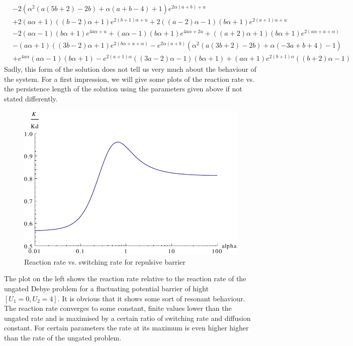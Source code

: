 \begin{align*}
    &-2 \left(\alpha^2 (a (5 b+2)-2 b)+\alpha (a+b-4)+1\right) e^{2 \alpha (a+b)+u} \\
    &+2 (a \alpha+1) ((b-2) \alpha+1) e^{2 (b+1) \alpha+u}+2 ((a-2) \alpha-1) (b \alpha+1) e^{2 (a+1) \alpha+u} \\
    &-2 (a \alpha-1) (b \alpha+1) e^{4 a \alpha+u}+(a \alpha-1) (b \alpha+1) e^{4 a \alpha+2 u}+((a+2) \alpha+1) (b \alpha+1) e^{2 (a \alpha+u+\alpha)} \\
    &-(a \alpha+1) ((3 b-2) \alpha+1) e^{2 (b \alpha+u+\alpha)}-e^{2 \alpha (a+b)} \left(\alpha^2 (a (3 b+2)-2 b)+\alpha (-3 a+b+4)-1\right) \\
    &+e^{4 a \alpha} (a \alpha-1) (b \alpha+1)-e^{2 (a+1) \alpha} ((3 a-2) \alpha-1) (b \alpha+1)+(a \alpha+1) e^{2 (b+1) \alpha} ((b+2) \alpha-1)
\end{align*}
Sadly, this form of the solution does not tell us very much about the behaviour of the system. For a first impression, we will give some plots of the reaction rate vs. the persistence length of the solution using the parameters given above if not stated differently.\\
\begin{minipage}[t]{0.7 \textwidth}
    \begin{figure}[H]
        \includegraphics[width = 1 \textwidth]{plots/rate1.pdf}
    \caption{Reaction rate vs. switching rate for repulsive barrier}
    \label{fig:finite_barrier_rate+}
    \end{figure}
\end{minipage}\begin{minipage}[t]{0.3 \textwidth}
The plot on the left shows the reaction rate relative to the reaction rate of the ungated Debye problem for a fluctuating potential barrier of hight $[U_1 = 0, U_2 = 4]$. It is obvious that it shows some sort of resonant behaviour. The reaction rate converges to some constant, finite values lower than the ungated rate and is maximised by a certain ratio of switching rate and diffusion constant. For certain parameters the rate at its maximum is even higher higher than the rate of the ungated problem.
\end{minipage}
